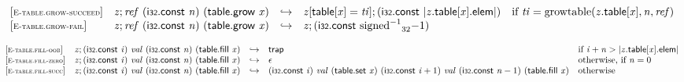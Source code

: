 \vspace{1ex}

$$
\begin{array}{@{}l@{}lcl@{}l@{}}
{[\textsc{\scriptsize E{-}table.grow{-}succeed}]} \quad & {\mathit{z}} ; {\mathit{ref}}~(\mathsf{i{\scriptstyle32}}.\mathsf{const}~{\mathit{n}})~(\mathsf{table.grow}~{\mathit{x}}) &\hookrightarrow& {\mathit{z}}[\mathsf{table}[{\mathit{x}}] = {\mathit{ti}}] ; (\mathsf{i{\scriptstyle32}}.\mathsf{const}~{|{{\mathit{z}}.\mathsf{table}}{[{\mathit{x}}]}.\mathsf{elem}|}) &\quad
  \mbox{if}~{\mathit{ti}} = {\mathrm{growtable}}({{\mathit{z}}.\mathsf{table}}{[{\mathit{x}}]}, {\mathit{n}}, {\mathit{ref}}) \\
{[\textsc{\scriptsize E{-}table.grow{-}fail}]} \quad & {\mathit{z}} ; {\mathit{ref}}~(\mathsf{i{\scriptstyle32}}.\mathsf{const}~{\mathit{n}})~(\mathsf{table.grow}~{\mathit{x}}) &\hookrightarrow& {\mathit{z}} ; (\mathsf{i{\scriptstyle32}}.\mathsf{const}~{{{{{\mathrm{signed}}^{{-1}}}}{}}_{32}}{{-1}}) &  \\
\end{array}
$$

\vspace{1ex}

$$
\begin{array}{@{}l@{}lcl@{}l@{}}
{[\textsc{\scriptsize E{-}table.fill{-}oob}]} \quad & {\mathit{z}} ; (\mathsf{i{\scriptstyle32}}.\mathsf{const}~{\mathit{i}})~{\mathit{val}}~(\mathsf{i{\scriptstyle32}}.\mathsf{const}~{\mathit{n}})~(\mathsf{table.fill}~{\mathit{x}}) &\hookrightarrow& \mathsf{trap} &\quad
  \mbox{if}~{\mathit{i}} + {\mathit{n}} > {|{{\mathit{z}}.\mathsf{table}}{[{\mathit{x}}]}.\mathsf{elem}|} \\
{[\textsc{\scriptsize E{-}table.fill{-}zero}]} \quad & {\mathit{z}} ; (\mathsf{i{\scriptstyle32}}.\mathsf{const}~{\mathit{i}})~{\mathit{val}}~(\mathsf{i{\scriptstyle32}}.\mathsf{const}~{\mathit{n}})~(\mathsf{table.fill}~{\mathit{x}}) &\hookrightarrow& \epsilon &\quad
  \mbox{otherwise, if}~{\mathit{n}} = 0 \\
{[\textsc{\scriptsize E{-}table.fill{-}succ}]} \quad & {\mathit{z}} ; (\mathsf{i{\scriptstyle32}}.\mathsf{const}~{\mathit{i}})~{\mathit{val}}~(\mathsf{i{\scriptstyle32}}.\mathsf{const}~{\mathit{n}})~(\mathsf{table.fill}~{\mathit{x}}) &\hookrightarrow& (\mathsf{i{\scriptstyle32}}.\mathsf{const}~{\mathit{i}})~{\mathit{val}}~(\mathsf{table.set}~{\mathit{x}})~(\mathsf{i{\scriptstyle32}}.\mathsf{const}~{\mathit{i}} + 1)~{\mathit{val}}~(\mathsf{i{\scriptstyle32}}.\mathsf{const}~{\mathit{n}} - 1)~(\mathsf{table.fill}~{\mathit{x}}) &\quad
  \mbox{otherwise} \\
\end{array}
$$

